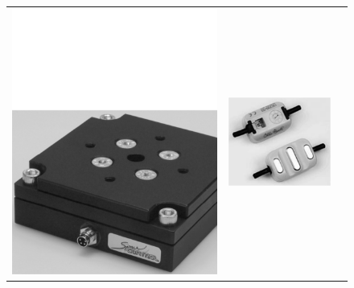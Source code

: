 \begin{figure}[!ht] \centering
  \begin{tabular}{ccc}
    \includegraphics[height=0.16\textheight]{figs/OFTS} &
    \includegraphics[height=0.16\textheight]{figs/ottobock} &

\end{tabular}
\end{figure}
